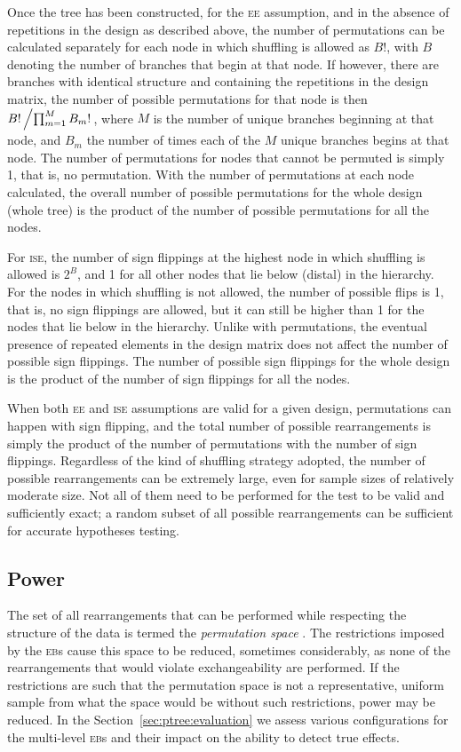 Once the tree has been constructed, for the \textsc{ee} assumption, and in the absence of repetitions in the design as described above, the number of permutations can be calculated separately for each node in which shuffling is allowed as $B!$, with $B$ denoting the number of branches that begin at that node. If however, there are branches with identical structure and containing the repetitions in the design matrix, the number of possible permutations for that node is then $B!\left/\prod^{M}_{m=1}B_m!\right.$, where $M$ is the number of unique branches beginning at that node, and $B_m$ the number of times each of the $M$ unique branches begins at that node. The number of permutations for nodes that cannot be permuted is simply 1, that is, no permutation. With the number of permutations at each node calculated, the overall number of possible permutations for the whole design (whole tree) is the product of the number of possible permutations for all the nodes.

For \textsc{ise}, the number of sign flippings at the highest node in which shuffling is allowed is $2^B$, and 1 for all other nodes that lie below (distal) in the hierarchy. For the nodes in which shuffling is not allowed, the number of possible flips is 1, that is, no sign flippings are allowed, but it can still be higher than 1 for the nodes that lie below in the hierarchy. Unlike with permutations, the eventual presence of repeated elements in the design matrix does not affect the number of possible sign flippings. The number of possible sign flippings for the whole design is the product of the number of sign flippings for all the nodes.

When both \textsc{ee} and \textsc{ise} assumptions are valid for a given design, permutations can happen with sign flipping, and the total number of possible rearrangements is simply the product of the number of permutations with the number of sign flippings. Regardless of the kind of shuffling strategy adopted, the number of possible rearrangements can be extremely large, even for sample sizes of relatively moderate size. Not all of them need to be performed for the test to be valid and sufficiently exact; a random subset of all possible rearrangements can be sufficient for accurate hypotheses testing.

\subsection{Power}

The set of all rearrangements that can be performed while respecting the structure of the data is termed the \emph{permutation space} \citep{Pesarin2010}. The restrictions imposed by the \textsc{eb}s cause this space to be reduced, sometimes considerably, as none of the rearrangements that would violate exchangeability are performed. If the restrictions are such that the permutation space is not a representative, uniform sample from what the space would be without such restrictions, power may be reduced. In the Section~\ref{sec:ptree:evaluation} we assess various configurations for the multi-level \textsc{eb}s and their impact on the ability to detect true effects.

